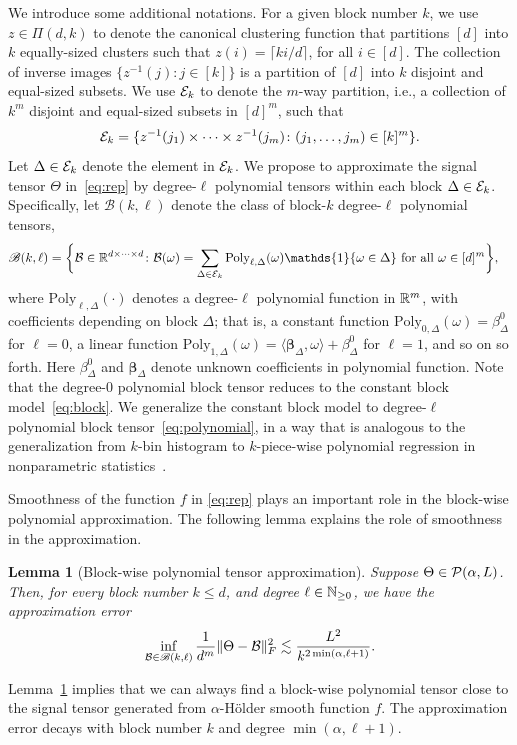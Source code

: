 \documentclass[12pt]{article}
\newtheorem{lem}{Lemma}
\theoremstyle{definition}
\def\caliB{\mathscr{B}}
\begin{document}
We introduce some additional notations. For a given block number $k$, we use $z\in\Pi(d,k)$ to denote the canonical clustering function that partitions $[d]$ into $k$ equally-sized clusters such that 
$z(i) = \lceil ki/d\rceil$, for all $i\in[d]$.
The collection of inverse images $\{z^{-1}(j)\colon j\in[k]\}$ is a partition of $[d]$ into $k$ disjoint and equal-sized subsets. We use $\mathcal{E}_k$ to denote the $m$-way partition, i.e., a collection of $k^m$ disjoint and equal-sized subsets in $[d]^m$, such that 
\begin{align}\label{eq:blockind}
    \mathcal{E}_k = \{z^{-1}(j_1)\times\cdots\times z^{-1}(j_m)\colon (j_1,\ldots,j_m)\in [k]^m\}.
\end{align}
Let $\Delta\in \mathcal{E}_k$ denote the element in $\mathcal{E}_k$. We propose to approximate the signal tensor $\Theta$ in~\eqref{eq:rep} by degree-$\ell$ polynomial tensors within each block $\Delta\in \mathcal{E}_k$. Specifically, let $\caliB(k,\ell)$ denote the class of block-$k$ degree-$\ell$ polynomial tensors,
\begin{align}\label{eq:polynomial}
    \caliB(k,\ell) = \bigg\{&\tB\in \bbR^{d\times \cdots \times d}\colon \tB(\omega) = \sum_{\Delta\in\tE_k}\text{Poly}_{\ell,\Delta}(\omega)\mathds{1}\{\omega\in\Delta\}\text{ for all } \omega\in[d]^m\bigg\},
\end{align}
where $\text{Poly}_{\ell,\Delta}(\cdot)$ denotes a degree-$\ell$ polynomial function in $\mathbb{R}^m$, with coefficients depending on block $\Delta$; that is, a constant function $\text{Poly}_{0,\Delta}(\omega)= \beta^0_{\Delta}$ for $\ell=0$, a linear function $\text{Poly}_{1,\Delta}(\omega)=\langle \boldsymbol{\beta}_{\Delta},\omega\rangle+\beta_{\Delta}^0$ for $\ell=1$, and so on so forth. Here $\beta^0_{\Delta}$ and $\boldsymbol{\beta}_{\Delta}$ denote unknown coefficients in polynomial function. Note that the degree-0 polynomial block tensor reduces to the constant block model~\eqref{eq:block}. We generalize the constant block model to degree-$\ell$ polynomial block tensor~\eqref{eq:polynomial}, in a way that is analogous to the generalization from $k$-bin histogram to $k$-piece-wise polynomial regression in nonparametric statistics~\citep{wasserman2006all}.

Smoothness of the function $f$ in \eqref{eq:rep} plays an important role in the block-wise polynomial approximation. The following lemma explains the role of smoothness in the approximation. 

\begin{lem}[Block-wise polynomial tensor approximation]\label{lem:approx}
Suppose  $\Theta\in\mathcal{P}(\alpha,L)$. Then, for every block number $k\leq d$, and degree $\ell\in \mathbb{N}_{\geq 0}$, we have the approximation error
\begin{align}
   \inf_{\tB\in\caliB(k,\ell)} \frac{1}{d^m}\FnormSize{}{\Theta-\tB}^2\lesssim \frac{L^2}{k^{2\min(\alpha,\ell+1)}}.
\end{align}
\end{lem}
Lemma~\ref{lem:approx} implies that we can always find a block-wise polynomial tensor close to the signal tensor generated from $\alpha$-H\"older smooth function $f$. The approximation error decays with block number $k$ and degree $\min(\alpha,\ell+1)$. 
\end{document}
